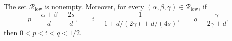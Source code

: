 The set \(\mathcal R_{\mathrm{low}}\) is nonempty.  Moreover, for every
\((\alpha,\beta,\gamma)\in\mathcal R_{\mathrm{low}}\), if
\[
p=\frac{\alpha+\beta}{d}=\frac{2s}{d},\qquad
t=\frac{1}{1+d/(2\gamma)+d/(4s)},\qquad
q=\frac{\gamma}{2\gamma+d},
\]
then \(0<p<t<q<1/2\).